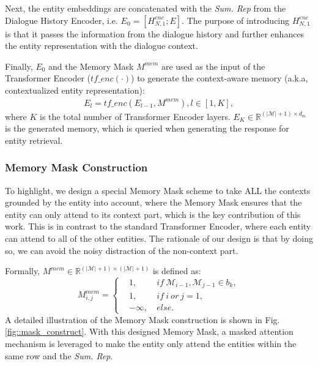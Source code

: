 \documentclass[11pt]{article}
\begin{document}
Next, the entity embeddings are concatenated with the \textit{Sum. Rep} from the Dialogue History Encoder, i.e. $E_0 = [H_{N,1}^{enc}; E]$. The purpose of introducing $H_{N,1}^{enc}$ is that it passes the information from the dialogue history and further enhances the entity representation with the dialogue context.


Finally, $E_0$ and the Memory Mask $M^{mem}$ are used as the input of the Transformer Encoder ($tf\_enc(\cdot)$) to generate the context-aware memory (a.k.a, contextualized entity representation):
\begin{gather}
    E_l =tf\_enc(E_{l-1}, M^{mem}), l \in [1, K], \nonumber
\end{gather}
where $K$ is the total number of Transformer Encoder layers. $E_K \in \mathbb{R}^{(|\mathcal{M}|+1) \times d_m}$  is the generated memory, which is queried when generating the response for entity retrieval.


\subsubsection{Memory Mask Construction}
\label{sssec::mem_mask}

To highlight, we design a special Memory Mask scheme to take ALL the contexts grounded by the entity into account, where the Memory Mask ensures that the entity can only attend to its context part, which is the key contribution of this work.
This is in contrast to the standard Transformer Encoder, where each entity can attend to all of the other entities. The rationale of our design is that by doing so, we can avoid the noisy distraction of the non-context part.

Formally, $M^{mem} \in \mathbb{R}^{(|\mathcal{M}|+1) \times (|\mathcal{M}|+1)}$ is defined as:
\begin{equation}
M^{mem}_{i,j}=\left\{
\begin{aligned}
&1, &\ if\  \mathcal{M}_{i-1}, \mathcal{M}_{j-1} \in b_k, \\
&1, &\ if\  i\ or\  j = 1, \\
&-\infty, &\ else. \nonumber
\end{aligned}
\right.
\end{equation}
A detailed illustration of the Memory Mask construction is shown in Fig. \ref{fig::mask_construct}. 
With this designed Memory Mask, a masked attention mechanism is leveraged to make the entity only attend the entities within the same row and the \textit{Sum. Rep}.
\end{document}
